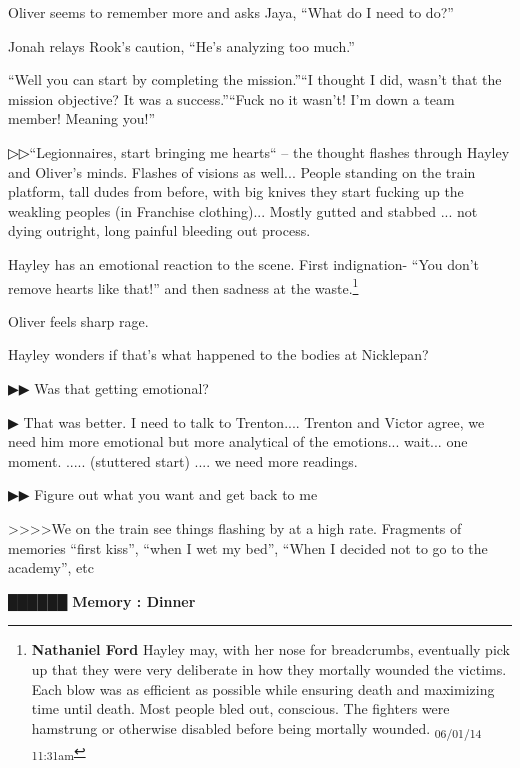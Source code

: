 Oliver seems to remember more and asks Jaya, ``What do I need to do?''

Jonah relays Rook's caution, ``He's analyzing too much.''

``Well you can start by completing the mission.''``I thought I did, wasn't that the mission objective?  It was a success.''``Fuck no it wasn't!  I'm down a team member!  Meaning you!''



▷▷``Legionnaires, start bringing me hearts`` -- the thought flashes through Hayley and Oliver's minds.  Flashes of visions as well... People standing on the train platform, tall dudes from before, with big knives they start fucking up the weakling peoples (in Franchise clothing)... Mostly gutted and stabbed ... not dying outright, long painful bleeding out process.  

Hayley has an emotional reaction to the scene.  First indignation- ``You don't remove hearts like that!'' and then sadness at the waste.\footnote{\textbf{Nathaniel Ford }Hayley may, with her nose for breadcrumbs, eventually pick up that they were very deliberate in how they mortally wounded the victims. Each blow was as efficient as possible while ensuring death and maximizing time until death. Most people bled out, conscious. The fighters were hamstrung or otherwise disabled before being mortally wounded. \textsubscript{06/01/14 11:31am}}

Oliver feels sharp rage.

Hayley wonders if that's what happened to the bodies at Nicklepan?  



 {\color[RGB]{68,68,68}▶▶ } Was that getting emotional?

 {\color[RGB]{68,68,68}▶} That was better.  I need to talk to Trenton.... Trenton and Victor agree, we need him more emotional but more analytical of the emotions... wait... one moment.   ..... (stuttered start) .... we need more readings. 

 {\color[RGB]{68,68,68}▶▶ } Figure out what you want and get back to me



\textgreater \textgreater \textgreater \textgreater  We on the train see things flashing by at a high rate. Fragments of memories ``first kiss'', ``when I wet my bed'', ``When I decided not to go to the academy'', etc



 {\LARGE \textbf{ {\color[RGB]{51,51,51}██████} } }  {\LARGE \textbf{ Memory : Dinner} } 

